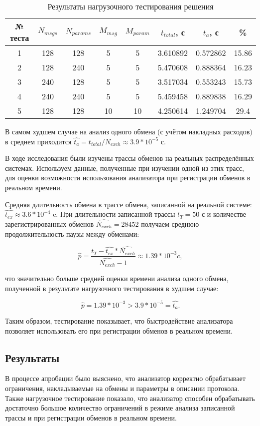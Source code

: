 \begin{table}[H]
 \centering
 \begin{tabular}{|c|*{7}{c|}}
  \hline
  № теста & $N_{msgs}$ & $N_{params}$ & $M_{msg}$ & $M_{param}$ & $t_{total}$, 
с & $t_{a}$, с & \% \\
  \hline
  1 & 128 & 128 & 5   & 5   & 3.610892 & 0.572862 & 15.86 \\
  2 & 128 & 240 & 5   & 5   & 5.470608 & 0.888364 & 16.23 \\
  3 & 240 & 128 & 5   & 5   & 3.517034 & 0.553243 & 15.73 \\
  4 & 240 & 240 & 5   & 5   & 5.459458 & 0.889838 & 16.29 \\
  5 & 128 & 128 & 10 & 10 & 4.250614 & 1.249704 & 29.4 \\
  \hline
 \end{tabular}
 \caption{Результаты нагрузочного тестирования решения}
 \label{tab:prof}
\end{table}

В самом худшем случае на анализ одного обмена (с учётом накладных расходов) в 
среднем приходится $\hat{t_{a}} = t_{total} / N_{exch} \approx 3.9 * 10^{-5}$ 
с. 

В ходе исследования были изучены трассы обменов на реальных распределённых 
системах. Используем данные, полученные при изучении одной из этих трасс, для 
оценки возможности использования анализатора при регистрации обменов в реальном 
времени.

Средняя длительность обмена в трассе обмена, записанной на реальной системе: 
$\hat{t_{ex}} \approx 3.6 * 10^{-4}$ c. При длительности записанной трассы 
$t_{T} = 50$ с и количестве зарегистрированных обменов $\hat{N_{exch}} = 28452$ 
получаем среднюю продолжительность паузы между обменами:

$$
\hat{p} = \frac{t_{T} - \hat{t_{ex}} * \hat{N_{exch}}}{\hat{N_{exch}} - 1} 
\approx 1.39 * 10^{-3} c,
$$

что значительно больше средней оценки времени анализа одного обмена, полученной 
в результате нагрузочного тестирования в худшем случае:

$$
\hat{p} = 1.39 * 10^{-3} > 3.9 * 10^{-5} = \hat{t_{a}}.
$$

Таким образом, тестирование показывает, что быстродействие анализатора 
позволяет использовать его при регистрации обменов в реальном времени.

\subsection{Результаты}

В процессе апробации было выяснено, что анализатор корректно обрабатывает 
ограничения, накладываемые на обмены и параметры в описании протокола. Также 
нагрузочное тестирование показало, что анализатор способен обрабатывать 
достаточно большое количество ограничений в режиме анализа записанной трассы 
и при регистрации обменов в реальном времени.